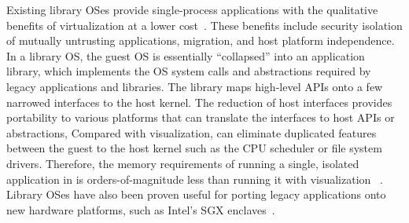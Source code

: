 
Existing library OSes provide single-process applications
with the qualitative benefits of virtualization
at a lower cost~\cite{porter11drawbridge,unikernels,baumann13bascule}.
These benefits include security isolation of mutually untrusting applications,
migration, and host platform independence.
In a library OS, the guest OS is essentially ``collapsed''
into an application library,
which implements the OS system calls and abstractions required by legacy applications
and libraries.
The library maps high-level APIs onto a few narrowed interfaces
to the host kernel.
The reduction of host interfaces provides portability to various platforms that can translate the interfaces to host APIs or abstractions,
Compared with visualization, 
\liboses{} can eliminate duplicated features between the guest to the host kernel
such as the CPU scheduler or file system drivers.
Therefore, 
the memory requirements of running a single, isolated application in \liboses{}
is  orders-of-magnitude
less than running it with visualization
~\cite{porter11drawbridge,unikernels}.
Library OSes have also been proven
useful for porting legacy applications
onto new hardware platforms, such as Intel's SGX enclaves~\cite{baumann14haven}.


